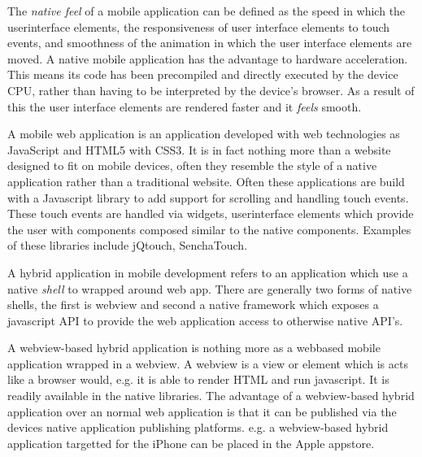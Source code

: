
The \emph{native feel} of a mobile application can be defined as the speed in which the userinterface elements, the responsiveness of user interface elements to touch events, and smoothness of the animation in which the user interface elements are moved.
A native mobile application has the advantage to hardware acceleration. This means its code has been precompiled and directly executed by the device CPU, rather than having to be interpreted by the device's browser. As a result of this the user interface elements are rendered faster and it \emph{feels} smooth.
 	

A mobile web application is an application developed with web technologies as JavaScript and HTML5 with CSS3. It is in fact nothing more than a website designed to fit on mobile devices, often they resemble the style of a native application rather than a traditional website. Often these applications are build with a Javascript library to add support for scrolling and handling touch events. These touch events are handled via widgets, userinterface elements which provide the user with components composed similar to the native components. Examples of these libraries include jQtouch, SenchaTouch.


A hybrid application in mobile development refers to an application which use a native \emph{shell} to wrapped around web app. There are generally two forms of native shells,  the first is  webview and second a native framework which exposes a javascript API to provide the web application access to otherwise native API's.

A webview-based hybrid application is nothing more as a webbased mobile application wrapped in a webview. A webview is a view or element which is acts like a browser would, e.g. it is able to render HTML and run javascript.  It is readily available in the native libraries. The advantage of a webview-based hybrid application over an normal web application is that it can be published via the devices native application publishing platforms. e.g. a webview-based hybrid application targetted for the iPhone can be placed in the Apple appstore. 

